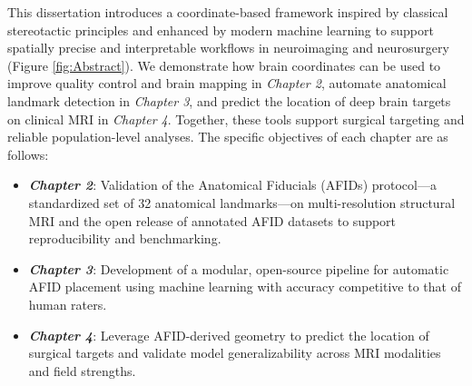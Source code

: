 This dissertation introduces a coordinate-based framework inspired by classical stereotactic principles and enhanced by modern machine learning to support spatially precise and interpretable workflows in neuroimaging and neurosurgery (Figure \ref{fig:Abstract}). We demonstrate how brain coordinates can be used to improve quality control and brain mapping in \textit{Chapter 2}, automate anatomical landmark detection in \textit{Chapter 3}, and predict the location of deep brain targets on clinical MRI in \textit{Chapter 4}. Together, these tools support surgical targeting and reliable population-level analyses. The specific objectives of each chapter are as follows:
\begin{itemize}
\item \textbf{\textit{Chapter 2}}: Validation of the Anatomical Fiducials (AFIDs) protocol—a standardized set of 32 anatomical landmarks—on multi-resolution structural MRI and the open release of annotated AFID datasets to support reproducibility and benchmarking.
\item \textbf{\textit{Chapter 3}}: Development of a modular, open-source pipeline for automatic AFID placement using machine learning with accuracy competitive to that of human raters.
\item \textbf{\textit{Chapter 4}}: Leverage AFID-derived geometry to predict the location of surgical targets and validate model generalizability across MRI modalities and field strengths.
\end{itemize}